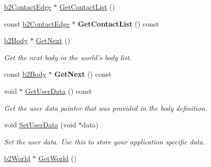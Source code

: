 \begin{DoxyCompactItemize}
\item 
\hyperlink{structb2_contact_edge}{b2\-Contact\-Edge} $\ast$ \hyperlink{classb2_body_a16bdbfb266c82a0ef51be351a8928bc5}{Get\-Contact\-List} ()
\item 
\hypertarget{classb2_body_aee5445ae5b170ad14c7d326040b6703e}{const \hyperlink{structb2_contact_edge}{b2\-Contact\-Edge} $\ast$ {\bfseries Get\-Contact\-List} () const }\label{classb2_body_aee5445ae5b170ad14c7d326040b6703e}

\item 
\hypertarget{classb2_body_ad54182a11d02362b027a0eb072775bdc}{\hyperlink{classb2_body}{b2\-Body} $\ast$ \hyperlink{classb2_body_ad54182a11d02362b027a0eb072775bdc}{Get\-Next} ()}\label{classb2_body_ad54182a11d02362b027a0eb072775bdc}

\begin{DoxyCompactList}\small\item\em Get the next body in the world's body list. \end{DoxyCompactList}\item 
\hypertarget{classb2_body_a2c7dc95d66e41c9150e98ea4ff401ad9}{const \hyperlink{classb2_body}{b2\-Body} $\ast$ {\bfseries Get\-Next} () const }\label{classb2_body_a2c7dc95d66e41c9150e98ea4ff401ad9}

\item 
\hypertarget{classb2_body_a6833f7e2ef1b6ac82641bb6b07ec50d1}{void $\ast$ \hyperlink{classb2_body_a6833f7e2ef1b6ac82641bb6b07ec50d1}{Get\-User\-Data} () const }\label{classb2_body_a6833f7e2ef1b6ac82641bb6b07ec50d1}

\begin{DoxyCompactList}\small\item\em Get the user data pointer that was provided in the body definition. \end{DoxyCompactList}\item 
\hypertarget{classb2_body_a5553a5ecdfd2d7200ba2405ce6043f52}{void \hyperlink{classb2_body_a5553a5ecdfd2d7200ba2405ce6043f52}{Set\-User\-Data} (void $\ast$data)}\label{classb2_body_a5553a5ecdfd2d7200ba2405ce6043f52}

\begin{DoxyCompactList}\small\item\em Set the user data. Use this to store your application specific data. \end{DoxyCompactList}\item 
\hypertarget{classb2_body_abfd9466763b20977f9122d0e162dfeb9}{\hyperlink{classb2_world}{b2\-World} $\ast$ \hyperlink{classb2_body_abfd9466763b20977f9122d0e162dfeb9}{Get\-World} ()}\label{classb2_body_abfd9466763b20977f9122d0e162dfeb9}


\end{DoxyCompactItemize}
